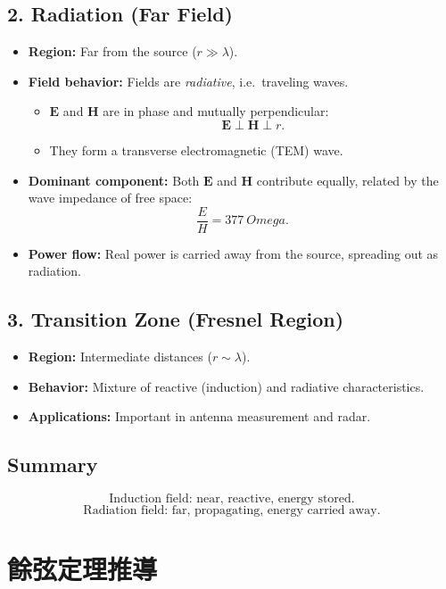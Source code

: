 \documentclass{article}
\def\Omega{Omega}%
\def\hat#1{#1}%
\begin{document}
\subsection*{2. Radiation (Far Field)}
\begin{itemize}
  \item \textbf{Region:} Far from the source ($r \gg \lambda$).
  \item \textbf{Field behavior:} Fields are \emph{radiative}, i.e.\ traveling waves.
    \begin{itemize}
      \item $\mathbf{E}$ and $\mathbf{H}$ are in phase and mutually perpendicular:
      \[
      \mathbf{E} \perp \mathbf{H} \perp \hat{r}.
      \]
      \item They form a transverse electromagnetic (TEM) wave.
    \end{itemize}
  \item \textbf{Dominant component:} Both $\mathbf{E}$ and $\mathbf{H}$ contribute equally, related by the wave impedance of free space:
    \[
    \frac{E}{H} = 377~\Omega.
    \]
  \item \textbf{Power flow:} Real power is carried away from the source, spreading out as radiation.
\end{itemize}

\subsection*{3. Transition Zone (Fresnel Region)}
\begin{itemize}
  \item \textbf{Region:} Intermediate distances ($r \sim \lambda$).
  \item \textbf{Behavior:} Mixture of reactive (induction) and radiative characteristics.
  \item \textbf{Applications:} Important in antenna measurement and radar.
\end{itemize}

\subsection*{Summary}
\[
\text{Induction field: near, reactive, energy stored.}
\]
\[
\text{Radiation field: far, propagating, energy carried away.}
\]
\section*{餘弦定理推導}
\end{document}
